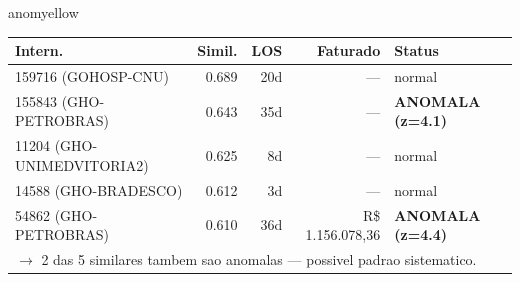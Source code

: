 \documentclass[a4paper,10pt]{article}
\begin{document}
\begin{anomalycard}[Internacao 107806 | PASA | MODERADO (z=2.04)]{anomyellow}
\begin{tabular}{l r r r l}\toprule\textbf{Intern.} & \textbf{Simil.} & \textbf{LOS} & \textbf{Faturado} & \textbf{Status} \\\midrule
159716 (GOHOSP-CNU) & 0.689 & 20d & --- & \textcolor{jcubeblue}{normal} \\
155843 (GHO-PETROBRAS) & 0.643 & 35d & --- & \textcolor{anomred}{\textbf{ANOMALA (z=4.1)}} \\
11204 (GHO-UNIMEDVITORIA2) & 0.625 & 8d & --- & \textcolor{jcubeblue}{normal} \\
14588 (GHO-BRADESCO) & 0.612 & 3d & --- & \textcolor{jcubeblue}{normal} \\
54862 (GHO-PETROBRAS) & 0.610 & 36d & R\$ 1.156.078,36 & \textcolor{anomred}{\textbf{ANOMALA (z=4.4)}} \\
\multicolumn{5}{l}{\textcolor{anomred}{\small $\rightarrow$ 2 das 5 similares tambem sao anomalas --- possivel padrao sistematico.}} \\
\bottomrule\end{tabular}


\end{anomalycard}

\newpage
\end{document}
